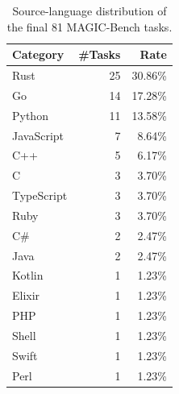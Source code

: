 \begin{table}[t]
\centering
\caption{Source-language distribution of the final 81 MAGIC-Bench tasks.}
\label{tab:tab_dataset_source_languages}
\begin{tabular}{lrr}
\toprule
Category & \#Tasks & Rate \\
\midrule
Rust & 25 & 30.86\% \\
Go & 14 & 17.28\% \\
Python & 11 & 13.58\% \\
JavaScript & 7 & 8.64\% \\
C++ & 5 & 6.17\% \\
C & 3 & 3.70\% \\
TypeScript & 3 & 3.70\% \\
Ruby & 3 & 3.70\% \\
C\# & 2 & 2.47\% \\
Java & 2 & 2.47\% \\
Kotlin & 1 & 1.23\% \\
Elixir & 1 & 1.23\% \\
PHP & 1 & 1.23\% \\
Shell & 1 & 1.23\% \\
Swift & 1 & 1.23\% \\
Perl & 1 & 1.23\% \\
\bottomrule
\end{tabular}
\end{table}
